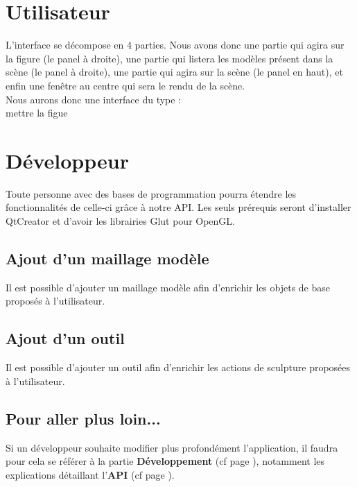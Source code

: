 \documentclass[a4paper]{memoir}
\begin{document}
		\section{Utilisateur}
			L'interface se d\'ecompose en 4 parties. Nous avons donc une partie qui agira sur la figure (le panel \`a droite), une partie qui listera les mod\`eles  pr\'esent dans la sc\`ene (le panel \`a droite), une partie qui agira sur la sc\`ene (le panel en haut), et enfin une fen\^etre au centre qui sera le rendu de la sc\`ene.\\
			Nous aurons donc une interface du type :\\ mettre la figue 
			

		\section{Développeur}
			Toute personne avec des bases de programmation pourra étendre les fonctionnalités de celle-ci grâce à notre API. Les seuls prérequis seront 
			d'installer QtCreator et d'avoir les librairies Glut pour OpenGL.
			
			\subsection{Ajout d'un maillage modèle}
				Il est possible d'ajouter un maillage modèle afin d'enrichir les objets de base proposés à l'utilisateur.
				
			\subsection{Ajout d'un outil}
				Il est possible d'ajouter un outil afin d'enrichir les actions de sculpture proposées à l'utilisateur.
				
			\subsection{Pour aller plus loin...}
				Si un développeur souhaite modifier plus profondément l'application, il faudra pour cela se référer à la partie \textbf{Développement} (cf 
				page \pageref{dev}), notamment les explications détaillant l'\textbf{API} (cf page \pageref{api-dev}).

\end{document}
